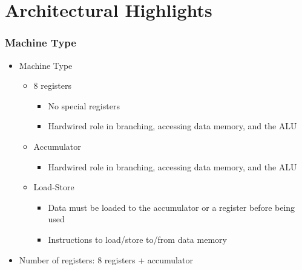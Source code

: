 

	\frame{\titlepage}

	\section{Architectural Highlights}

	\begin{frame}
		\frametitle{Machine Type}

		\begin{itemize}
			\item Machine Type
				\begin{itemize}
					\item 8 registers
						\begin{itemize}
							\item No special registers
							\item Hardwired role in branching, accessing data memory, and the ALU
						\end{itemize}
					\item Accumulator
						\begin{itemize}
							\item Hardwired role in branching, accessing data memory, and the ALU
						\end{itemize}
					\item Load-Store
						\begin{itemize}
							\item Data must be loaded to the accumulator or a register before being used
							\item Instructions to load/store to/from data memory
						\end{itemize}
				\end{itemize}
			\item Number of registers: 8 registers + accumulator
		\end{itemize}
	\end{frame}
